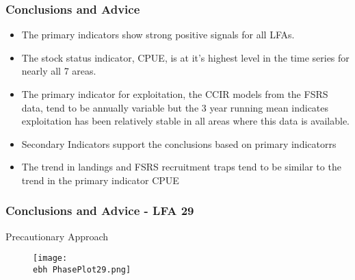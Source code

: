 \documentclass{beamer}
\newcommand{\ebh}{\string~/bio.data/bio.lobster/figures/Assessment/LFA2732/} %
\begin{document}
\begin{frame}
\frametitle{Conclusions and Advice}
\begin{itemize}

\item The primary indicators show strong positive signals for all LFAs. 
\item The stock status indicator, CPUE, is at it’s highest level in the time series for nearly all 7 areas. 
\item The primary indicator for exploitation, the CCIR models from the FSRS data, tend to be annually variable but the 3 year running mean indicates exploitation has been relatively stable in all areas where this data is available. 
\item Secondary Indicators support the conclusions based on primary indicatorrs
\item The trend in landings and FSRS recruitment traps tend to be similar to the trend in the primary indicator CPUE
\end{itemize}
\end{frame}





\begin{frame}
\frametitle{Conclusions and Advice - LFA 29}
Precautionary Approach
\begin{figure}
        \begin{center}
            \texttt{[image: \\ebh PhasePlot29.png]}
        \end{center}
    \end{figure}
\end{frame}
\end{document}
